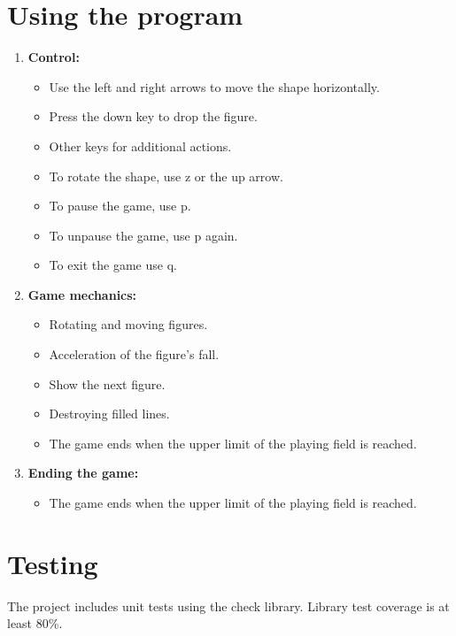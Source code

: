 \documentclass{article}
\begin{document}
\section{Using the program}

\begin{enumerate}
    \item \textbf{Control:}
        \begin{itemize}
            \item Use the left and right arrows to move the shape horizontally.
            \item Press the down key to drop the figure.
            \item Other keys for additional actions.
            \item To rotate the shape, use z or the up arrow.
            \item To pause the game, use p.
            \item To unpause the game, use p again.
            \item To exit the game use q.
        \end{itemize}
    \item \textbf{Game mechanics:}
        \begin{itemize}
            \item Rotating and moving figures.
            \item Acceleration of the figure's fall.
            \item Show the next figure.
            \item Destroying filled lines.
            \item The game ends when the upper limit of the playing field is reached.
        \end{itemize}
    \item \textbf{Ending the game:}
        \begin{itemize}
            \item The game ends when the upper limit of the playing field is reached.
        \end{itemize}
\end{enumerate}

\section{Testing}

The project includes unit tests using the check library. Library test coverage is at least 80\%.
\end{document}
